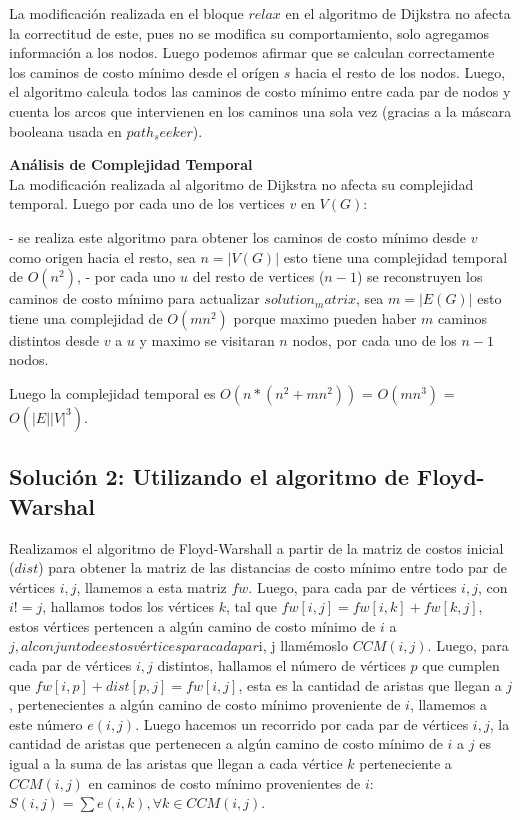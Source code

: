 \documentclass[
10pt, %
a4paper, %
oneside, %
headinclude,footinclude, %
BCOR5mm, %
]{scrartcl}
\begin{document}
La modificación realizada en el bloque $relax$ en el algoritmo de Dijkstra no afecta la correctitud de este,
pues no se modifica su comportamiento, solo agregamos información a los nodos. Luego podemos afirmar que se calculan 
correctamente los caminos de costo mínimo desde el orígen $s$ hacia el resto
de los nodos. Luego, el algoritmo calcula todos las caminos de costo mínimo
entre cada par de nodos y cuenta los arcos que intervienen en los caminos una
sola vez (gracias a la máscara booleana usada en $path_seeker$).


\textbf{Análisis de Complejidad Temporal}\\

La modificación realizada al algoritmo de Dijkstra no afecta su complejidad temporal. Luego por cada uno de
los vertices $v$ en $V(G)$:

- se realiza este algoritmo para obtener los caminos de costo mínimo desde $v$ como origen
hacia el resto, sea $n = |V(G)|$ esto tiene una complejidad temporal de $O(n^2)$,
- por cada uno $u$ del resto de vertices ($n-1$) se reconstruyen los caminos de costo mínimo para actualizar
$solution_matrix$, sea $m = |E(G)|$ esto tiene una complejidad de $O(mn^2)$ porque maximo pueden haber $m$
caminos distintos desde $v$ a $u$ y maximo se visitaran $n$ nodos, por cada uno de los $n-1$ nodos.

Luego la complejidad temporal es $O(n * (n^2 + mn^2))$ = $O(mn^3)$ = $O(|E||V|^3)$.


\subsection{Solución 2: Utilizando el algoritmo de Floyd-Warshal}

Realizamos el algoritmo de Floyd-Warshall a partir de la matriz de costos
inicial ($dist$) para obtener la matriz de las distancias de costo mínimo entre
todo par de vértices $i, j$, llamemos a esta matriz $fw$. Luego, para cada par
de vértices $i, j$, con $i != j$, hallamos todos los vértices $k$, tal que $fw[i, j] =
fw[i, k]+fw[k, j]$, estos vértices pertencen a algún camino de costo mínimo de $i$ a
$j, al conjunto de estos vértices para cada par $i, j llamémoslo $CCM(i, j)$. Luego,
para cada par de vértices $i, j$ distintos, hallamos el número de vértices $p$
que cumplen que $fw[i, p] + dist[p, j] = fw[i, j]$, esta es la cantidad de aristas
que llegan a $j$, pertenecientes a algún camino de costo mínimo proveniente de
$i$, llamemos a este número $e(i, j)$.  Luego hacemos un recorrido por cada par de
vértices $i, j$, la cantidad de aristas que pertenecen a algún camino de costo
mínimo de $i$ a $j$ es igual a la suma de las aristas que llegan a cada vértice $k$
perteneciente a $CCM(i, j)$ en caminos de costo mínimo provenientes de $i$:\\
$S(i, j) = \sum e(i, k), \forall k \in CCM(i, j)$.
\end{document}
